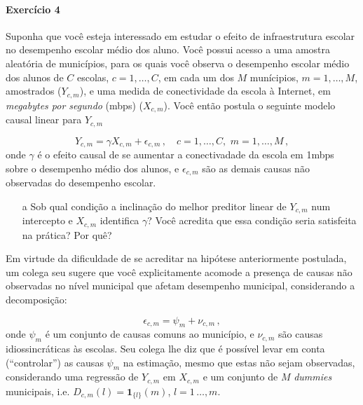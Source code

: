 \documentclass[10pt,a4paper]{article}
\begin{document}
  \paragraph{Exercício 4} Suponha que você esteja interessado em estudar o efeito de infraestrutura escolar no desempenho escolar médio dos aluno. Você possui acesso a uma amostra aleatória de municípios, para os quais você observa o desempenho escolar médio dos alunos de $C$ escolas, $c=1,\ldots, C$, em cada um dos $M$ munícipios,  $m=1,\ldots, M$, amostrados ($Y_{c,m}$), e uma medida de conectividade da escola à Internet, em \textit{megabytes por segundo} (mbps) ($X_{c,m}$). Você então postula o seguinte modelo causal linear para $Y_{c,m}$
  
  $$Y_{c,m} = \gamma X_{c,m} + \epsilon_{c,m}\,,\quad c=1, \ldots,  C, \, \, m=1,\ldots, M\, ,$$
 onde $\gamma$ é o efeito causal de se aumentar a conectivadade da escola em 1mbps sobre o desempenho médio dos alunos, e $\epsilon_{c,m}$ são as demais causas não observadas do desempenho escolar.
 
 \begin{itemize}
 	\item[a] Sob qual condição a inclinação do melhor preditor linear de $Y_{c,m}$ num intercepto e $X_{c,m}$ identifica $\gamma$? Você acredita que essa condição seria satisfeita na prática? Por quê?
 \end{itemize}
 \vspace{0.5 em}
 
 Em virtude da dificuldade de se acreditar na hipótese anteriormente postulada, um colega seu sugere que você explicitamente acomode a presença de causas não observadas no nível municipal que afetam desempenho municipal, considerando a decomposição:
 
 $$\epsilon_{c,m} = \psi_m + \nu_{c,m}\, , $$
 onde $\psi_m$ é um conjunto de causas comuns ao município, e $\nu_{c,m}$ são causas idiossincráticas às escolas. Seu colega lhe diz que é possível levar em conta  (``controlar'') as causas $\psi_m$ na estimação, mesmo que estas não sejam observadas, considerando uma regressão de $Y_{c,m}$ em $X_{c,m}$ e um conjunto de $M$ \textit{dummies} municipais, i.e. $D_{c,m}(l) =\mathbf{1}_{\{l\}}(m)$, $l=1\,\ldots, m$.
 
\end{document}

